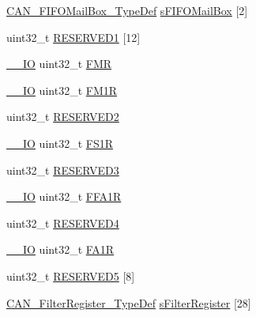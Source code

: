 \begin{DoxyCompactItemize}
\item 
\hyperlink{struct_c_a_n___f_i_f_o_mail_box___type_def}{C\+A\+N\+\_\+\+F\+I\+F\+O\+Mail\+Box\+\_\+\+Type\+Def} \hyperlink{struct_c_a_n___type_def_a21b030b34e131f7ef6ea273416449fe4}{s\+F\+I\+F\+O\+Mail\+Box} \mbox{[}2\mbox{]}
\item 
uint32\+\_\+t \hyperlink{struct_c_a_n___type_def_a4bb07a7828fbd5fe86f6a5a3545c177d}{R\+E\+S\+E\+R\+V\+E\+D1} \mbox{[}12\mbox{]}
\item 
\hyperlink{group___c_m_s_i_s__core__definitions_gaec43007d9998a0a0e01faede4133d6be}{\+\_\+\+\_\+\+IO} uint32\+\_\+t \hyperlink{struct_c_a_n___type_def_a1cb734df34f6520a7204c4c70634ebba}{F\+MR}
\item 
\hyperlink{group___c_m_s_i_s__core__definitions_gaec43007d9998a0a0e01faede4133d6be}{\+\_\+\+\_\+\+IO} uint32\+\_\+t \hyperlink{struct_c_a_n___type_def_aaa6f4cf1f16aaa6d17ec6c410db76acf}{F\+M1R}
\item 
uint32\+\_\+t \hyperlink{struct_c_a_n___type_def_a4c9b972a304c0e08ca27cbe57627c496}{R\+E\+S\+E\+R\+V\+E\+D2}
\item 
\hyperlink{group___c_m_s_i_s__core__definitions_gaec43007d9998a0a0e01faede4133d6be}{\+\_\+\+\_\+\+IO} uint32\+\_\+t \hyperlink{struct_c_a_n___type_def_aae0256ae42106ee7f87fc7e5bdb779d4}{F\+S1R}
\item 
uint32\+\_\+t \hyperlink{struct_c_a_n___type_def_af2b40c5e36a5e861490988275499e158}{R\+E\+S\+E\+R\+V\+E\+D3}
\item 
\hyperlink{group___c_m_s_i_s__core__definitions_gaec43007d9998a0a0e01faede4133d6be}{\+\_\+\+\_\+\+IO} uint32\+\_\+t \hyperlink{struct_c_a_n___type_def_af1405e594e39e5b34f9499f680157a25}{F\+F\+A1R}
\item 
uint32\+\_\+t \hyperlink{struct_c_a_n___type_def_ac0018930ee9f18afda25b695b9a4ec16}{R\+E\+S\+E\+R\+V\+E\+D4}
\item 
\hyperlink{group___c_m_s_i_s__core__definitions_gaec43007d9998a0a0e01faede4133d6be}{\+\_\+\+\_\+\+IO} uint32\+\_\+t \hyperlink{struct_c_a_n___type_def_aaf76271f4ab0b3deb3ceb6e2ac0d62d0}{F\+A1R}
\item 
uint32\+\_\+t \hyperlink{struct_c_a_n___type_def_a269f31b91d0f38a48061b76ecc346f55}{R\+E\+S\+E\+R\+V\+E\+D5} \mbox{[}8\mbox{]}
\item 
\hyperlink{struct_c_a_n___filter_register___type_def}{C\+A\+N\+\_\+\+Filter\+Register\+\_\+\+Type\+Def} \hyperlink{struct_c_a_n___type_def_a31bd74513e6e599319702ad34113bf59}{s\+Filter\+Register} \mbox{[}28\mbox{]}
\end{DoxyCompactItemize}



